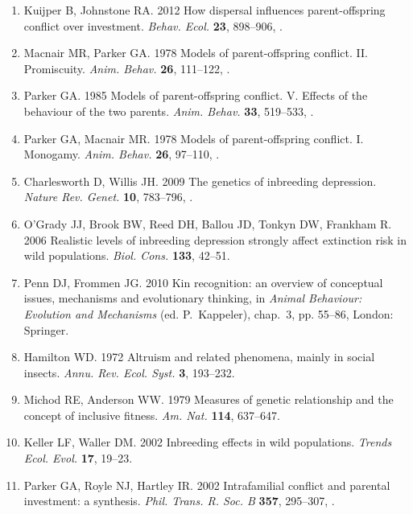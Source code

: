 \documentclass[12pt]{article}
\begin{document}
\begin{enumerate}
\item{Kuijper B, Johnstone RA. 2012 {How dispersal influences
  parent-offspring conflict over investment}. \textit{Behav. Ecol.}
  \textbf{23}, 898--906, .}

\item{Macnair MR, Parker GA. 1978 {Models of parent-offspring conflict. II.
  Promiscuity}. \textit{Anim. Behav.} \textbf{26}, 111--122,
  .}

\item{Parker GA. 1985 {Models of parent-offspring conflict. V. Effects of the
  behaviour of the two parents}. \textit{Anim. Behav.} \textbf{33},
  519--533, .}

\item{Parker GA, Macnair MR. 1978 {Models of parent-offspring conflict. I.
  Monogamy}. \textit{Anim. Behav.} \textbf{26}, 97--110,
  .}

\item{Charlesworth D, Willis JH. 2009 {The genetics of inbreeding
  depression}. \textit{Nature Rev. Genet.} \textbf{10}, 783--796,
  .}

\item{O'Grady JJ, Brook BW, Reed DH, Ballou JD, Tonkyn DW, 
  Frankham R. 2006 {Realistic levels of inbreeding depression strongly affect
  extinction risk in wild populations}. \textit{Biol. Cons.}
  \textbf{133}, 42--51.}

\item{Penn DJ, Frommen JG. 2010 {Kin recognition: an overview of conceptual
  issues, mechanisms and evolutionary thinking}, in \textit{Animal Behaviour:
  Evolution and Mechanisms} (ed. P.~Kappeler), chap.~3, pp. 55--86, London:
  Springer.}

\item{Hamilton WD. 1972 {Altruism and related phenomena, mainly in social
  insects}. \textit{Annu. Rev. Ecol. Syst.} \textbf{3},
  193--232.}

\item{Michod RE, Anderson WW. 1979 {Measures of genetic relationship and
  the concept of inclusive fitness}. \textit{Am. Nat.} \textbf{114},
  637--647.}

\item{Keller LF, Waller DM. 2002 {Inbreeding effects in wild populations}.
  \textit{Trends Ecol. Evol.} \textbf{17}, 19--23.}

\item{Parker GA, Royle NJ, Hartley IR. 2002 {Intrafamilial conflict and
  parental investment: a synthesis.} \textit{Phil. Trans. R. Soc. B} 
  \textbf{357}, 295--307, .}


\end{enumerate}
\end{document}
